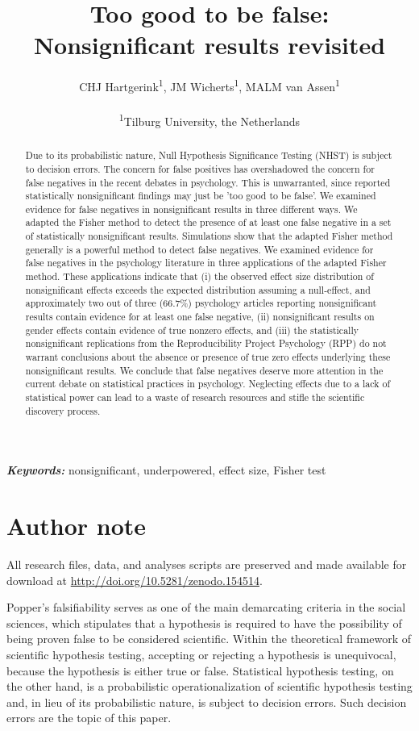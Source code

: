 \documentclass{article}
\title{Too good to be false: Nonsignificant results revisited}
\author{CHJ Hartgerink\textsuperscript{1}, JM Wicherts\textsuperscript{1}, MALM van Assen\textsuperscript{1}\\ \\
\textsuperscript{1}Tilburg University, the Netherlands}
\providecommand{\keywords}[1]{\textbf{\textit{Keywords:}} #1}
\begin{document}

\maketitle

\begin{abstract}
Due to its probabilistic nature, Null Hypothesis Significance Testing (NHST) is subject to decision errors. The concern for false positives has overshadowed the concern for false negatives in the recent debates in psychology. This is unwarranted,  since  reported statistically nonsignificant findings may just be 'too good to be false'. We examined evidence for false negatives in nonsignificant results in three different ways. We adapted the Fisher method to detect the presence of at least one false negative in a set of statistically nonsignificant results. Simulations show that the adapted Fisher method generally is a powerful method to detect false negatives. We examined evidence for false negatives in the psychology literature in three applications of the adapted Fisher method. These applications indicate that (i) the observed effect size distribution of nonsignificant effects exceeds the expected distribution assuming a null-effect, and approximately two out of three (66.7\%) psychology articles reporting nonsignificant results contain evidence for at least one false negative, (ii) nonsignificant results on gender effects contain evidence of true nonzero effects, and (iii) the statistically nonsignificant replications from the Reproducibility Project Psychology (RPP) do not warrant conclusions about the absence or presence of true zero effects underlying these nonsignificant results. We conclude that false negatives deserve more attention in the current debate on statistical practices in psychology. Neglecting effects due to a lack of statistical power can lead to a waste of research resources and stifle the scientific discovery process.
\end{abstract}

\keywords{nonsignificant, underpowered, effect size, Fisher test}

\section*{Author note}
All research files, data, and analyses scripts are preserved and made available for download at \url{http://doi.org/10.5281/zenodo.154514}.
\newpage


Popper's \cite{Popper2005-xu} falsifiability serves as one of the main demarcating criteria in the social sciences, which stipulates that a hypothesis is required to have the possibility of being proven false to be considered scientific. Within the theoretical framework of scientific hypothesis testing, accepting or rejecting a hypothesis is unequivocal, because the hypothesis is either true or false. Statistical hypothesis testing, on the other hand, is a probabilistic operationalization of scientific hypothesis testing \cite{meehl1978theoretical} and, in lieu of its probabilistic nature, is subject to decision errors. Such decision errors are the topic of this paper.
\end{document}
